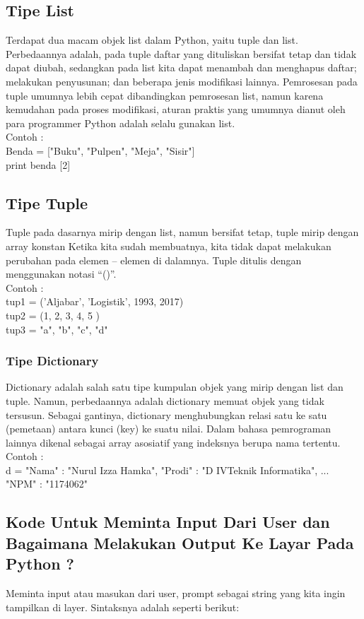 \subsection{Tipe List}
Terdapat dua macam objek list dalam Python, yaitu tuple dan list. Perbedaannya adalah, pada tuple daftar yang dituliskan bersifat tetap dan tidak dapat diubah, sedangkan pada list kita dapat menambah dan menghapus daftar; melakukan penyusunan; dan beberapa jenis modifikasi lainnya. Pemrosesan pada tuple umumnya lebih cepat dibandingkan pemrosesan list, namun karena kemudahan pada proses modifikasi, aturan praktis yang umumnya dianut oleh para programmer Python adalah selalu gunakan list.\\

Contoh :\\
Benda = ["Buku", "Pulpen", "Meja", "Sisir"]\\
print benda [2]

\subsection{Tipe Tuple}
Tuple pada dasarnya mirip dengan list, namun bersifat tetap, tuple mirip dengan array konstan Ketika kita sudah membuatnya, kita tidak dapat melakukan perubahan pada elemen – elemen di dalamnya. Tuple ditulis dengan menggunakan notasi “()”.\\
Contoh : \\
tup1 = ('Aljabar', 'Logistik', 1993, 2017)\\
tup2 = (1, 2, 3, 4, 5 )\\
tup3 = "a", "b", "c", "d"\\
\subsubsection{Tipe Dictionary}

Dictionary adalah salah satu tipe kumpulan objek yang mirip dengan list dan tuple. Namun, perbedaannya adalah dictionary memuat objek yang tidak tersusun. Sebagai gantinya, dictionary menghubungkan relasi satu ke satu (pemetaan) antara kunci (key) ke suatu nilai. Dalam bahasa pemrograman lainnya dikenal sebagai array asosiatif yang indeksnya berupa nama tertentu.\\

Contoh :\\
d = {"Nama" : "Nurul Izza Hamka", "Prodi" : "D IVTeknik Informatika", ... "NPM" : "1174062"}

\subsection{Kode Untuk Meminta Input Dari User dan Bagaimana Melakukan Output Ke Layar Pada Python ?}
Meminta input atau masukan dari user, prompt sebagai string yang kita ingin tampilkan di layer.  Sintaksnya adalah seperti berikut:\\

